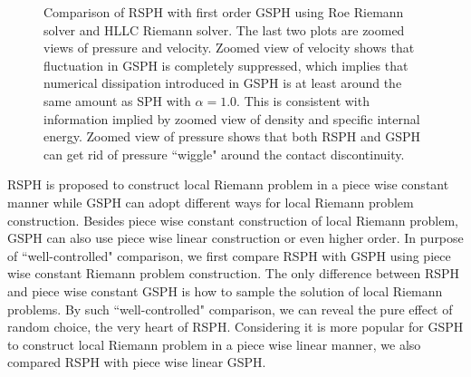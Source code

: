 \documentclass[preprint,12pt,authoryear]{elsarticle}
\begin{document}
\begin{figure}[H]
\begin{minipage}{.545\textwidth}
\begin{flushleft}
        \end{flushleft}
    \end{minipage}%
    \caption{Comparison of RSPH with first order GSPH using Roe Riemann solver and HLLC Riemann solver. The last two plots are zoomed views of pressure and velocity. Zoomed view of velocity shows that fluctuation in GSPH is completely suppressed, which implies that numerical dissipation introduced in GSPH is at least around the same amount as SPH with $\alpha=1.0$. This is consistent with information implied by zoomed view of density and specific internal energy. Zoomed view of pressure shows that both RSPH and GSPH can get rid of pressure ``wiggle" around the contact discontinuity.}
    \label{fig:RCM-Sod-GSPH}
\end{figure}

RSPH is proposed to construct local Riemann problem in a piece wise constant manner while GSPH can adopt different ways for local Riemann problem construction. Besides piece wise constant construction of local Riemann problem, GSPH can also use piece wise linear construction or even higher order. In purpose of ``well-controlled" comparison, we first compare RSPH with GSPH using piece wise constant Riemann problem construction. The only difference between RSPH and piece wise constant GSPH is how to sample the solution of local Riemann problems. By such ``well-controlled" comparison, we can reveal the pure effect of random choice, the very heart of RSPH. Considering it is more popular for GSPH to construct local Riemann problem in a piece wise linear manner, we also compared RSPH with piece wise linear GSPH.
\end{document}
